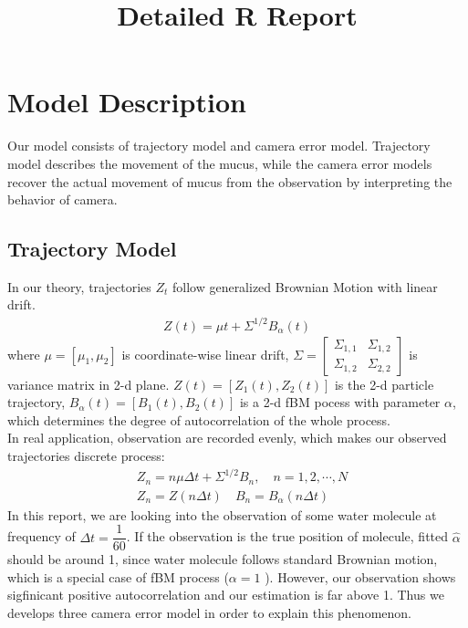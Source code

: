 \documentclass[12pt,letterpaper]{article}\usepackage[]{graphicx}\usepackage[]{color}
\theoremstyle{definition}\newtheorem*{conject}{Conjecture}
\newcommand{\dt}{\Delta t}
\begin{document}
\title{Detailed R Report}
\date{}

\maketitle
\thispagestyle{firstpage}
\vspace{-4em}

\section{Model Description}
Our model consists of trajectory model and camera error model. Trajectory model describes the movement of the mucus, while the camera error models recover the actual movement of mucus from the observation by interpreting the behavior of camera.

\subsection{Trajectory Model}
In our theory, trajectories $Z_t$ follow generalized Brownian Motion with linear drift.
\begin{align*}
	Z(t) = \mu t + \Sigma^{1/2} B_\alpha(t)
\end{align*}
where $\mu =  \left[\mu_1, \mu_2\right]$ is coordinate-wise linear drift, $\Sigma = \begin{bmatrix}
\Sigma_{1,1} & \Sigma_{1,2} \\
\Sigma_{1,2} & \Sigma_{2,2}
\end{bmatrix}$ is variance matrix in 2-d plane. $Z(t) = \left[ Z_1(t), Z_2(t) \right]$ is the 2-d particle trajectory, $B_\alpha(t) = \left[B_1(t), B_2(t)\right]$ is a 2-d fBM pocess with parameter $\alpha$, which determines the degree of autocorrelation of the whole process.\\
In real application, observation are recorded evenly, which makes our observed trajectories discrete process:
\begin{align*}
	& Z_n = n \mu  \dt + \Sigma^{1/2} B_n, \quad n = 1,2,\cdots, N \\
	& Z_n = Z(n\dt) \quad B_n = B_\alpha(n\dt)
\end{align*}
In this report, we are looking into the observation of some water molecule at frequency of $\dt = \dfrac{1}{60}$. If the observation is the true position of molecule, fitted $\widehat{\alpha}$ should be around 1, since water molecule follows standard Brownian motion, which is a special case of fBM process ($\alpha = 1$ ). However, our observation shows sigfinicant positive autocorrelation and our estimation is far above 1. Thus we develops three camera error model in order to explain this phenomenon.
\end{document}
